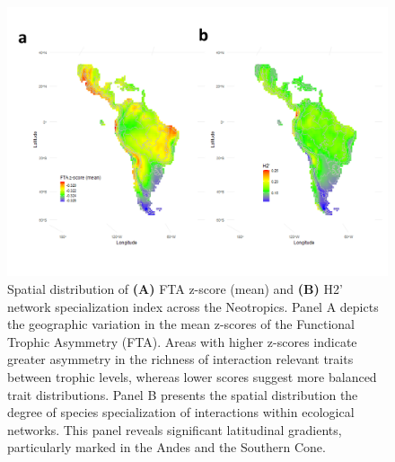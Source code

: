 \documentclass[
]{agujournal2019}
\begin{document}
\begin{figure}[H]

{\centering \includegraphics{Main_figures/00_network_maps.tif.png}

}

\caption{Spatial distribution of \textbf{(A)} FTA z-score (mean) and
\textbf{(B)} H2' network specialization index across the Neotropics.
Panel A depicts the geographic variation in the mean z-scores of the
Functional Trophic Asymmetry (FTA). Areas with higher z-scores indicate
greater asymmetry in the richness of interaction relevant traits between
trophic levels, whereas lower scores suggest more balanced trait
distributions. Panel B presents the spatial distribution the degree of
species specialization of interactions within ecological networks. This
panel reveals significant latitudinal gradients, particularly marked in
the Andes and the Southern Cone.}

\end{figure}%
\end{document}
